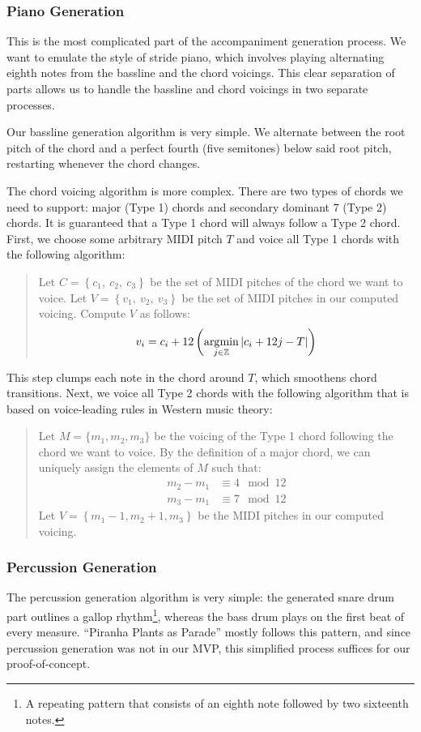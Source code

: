\subsubsection{Piano Generation}

This is the most complicated part of the accompaniment generation process. We want to emulate the style of stride piano, which involves playing alternating eighth notes from the bassline and the chord voicings. This clear separation of parts allows us to handle the bassline and chord voicings in two separate processes.

Our bassline generation algorithm is very simple. We alternate between the root pitch of the chord and a perfect fourth (five semitones) below said root pitch, restarting whenever the chord changes.

The chord voicing algorithm is more complex. There are two types of chords we need to support: major (Type 1) chords and secondary dominant 7 (Type 2) chords. It is guaranteed that a Type 1 chord will always follow a Type 2 chord. First, we choose some arbitrary MIDI pitch $T$ and voice all Type 1 chords with the following algorithm:
\begin{quote}
    Let $C = \left\{ c_1, \ c_2, \ c_3 \right\}$ be the set of MIDI pitches of the chord we want to voice.
    Let $V = \left\{ v_1, \ v_2, \ v_3 \right\}$ be the set of MIDI pitches in our computed voicing.
    Compute $V$ as follows:
    $$v_i = c_i + 12 \left( \operatorname*{\arg\!\min}_{j \in \mathbb{Z}} \left\lvert c_i + 12j - T \right\rvert \right)$$
\end{quote}
This step clumps each note in the chord around $T$, which smoothens chord transitions. Next, we voice all Type 2 chords with the following algorithm that is based on voice-leading rules in Western music theory:
\begin{quote}
    Let $M = \{ m_1, m_2, m_3\}$ be the voicing of the Type 1 chord following the chord we want to voice. By the definition of a major chord, we can uniquely assign the elements of $M$ such that:
    \begin{align*}
        m_2 - m_1 &\equiv 4 \mod 12 \\
        m_3 - m_1 &\equiv 7 \mod 12
    \end{align*}
    Let $V = \left\{ m_1 - 1, m_2 + 1, m_3 \right\}$ be the MIDI pitches in our computed voicing.
\end{quote}

\subsubsection{Percussion Generation}

The percussion generation algorithm is very simple: the generated snare drum part outlines a gallop rhythm\footnote{A repeating pattern that consists of an eighth note followed by two sixteenth notes.}, whereas the bass drum plays on the first beat of every measure. ``Piranha Plants as Parade'' mostly follows this pattern, and since percussion generation was not in our MVP, this simplified process suffices for our proof-of-concept.